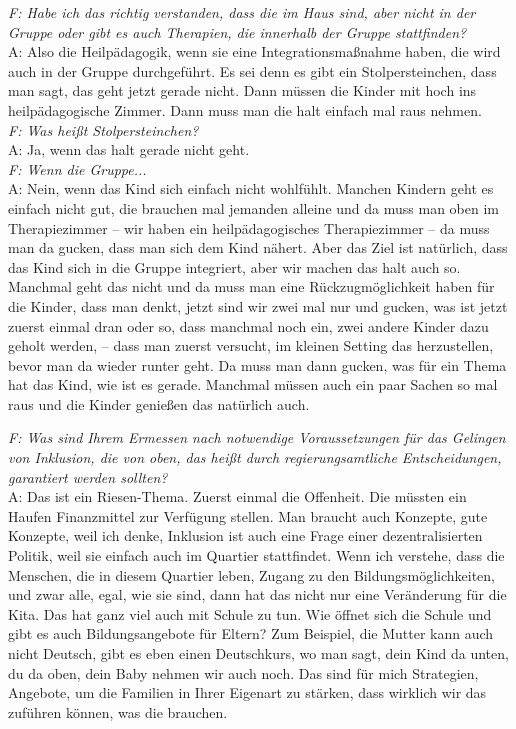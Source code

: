 \begin{linenumbers*}
\emph{F: Habe ich das richtig verstanden, dass die im Haus sind, aber nicht in der Gruppe oder gibt es auch Therapien, die innerhalb der Gruppe stattfinden?}\\ 
A: Also die Heilpädagogik, wenn sie eine Integrationsmaßnahme haben, die wird auch in der Gruppe durchgeführt. Es sei denn es gibt ein Stolpersteinchen, dass man sagt, das geht jetzt gerade nicht. Dann müssen die Kinder mit hoch ins heilpädagogische Zimmer. Dann muss man die halt einfach mal raus nehmen.\\
\emph{F: Was heißt Stolpersteinchen?}\\ 
A: Ja, wenn das halt gerade nicht geht.\\ 
\emph{F: Wenn die Gruppe...}\\
A: Nein, wenn das Kind sich einfach nicht wohlfühlt. Manchen Kindern geht es einfach nicht gut, die brauchen mal jemanden alleine und da muss man oben im Therapiezimmer -- wir haben ein heilpädagogisches Therapiezimmer -- da muss man da gucken, dass man sich dem Kind nähert. Aber das Ziel ist natürlich, dass das Kind sich in die Gruppe integriert, aber wir machen das halt auch so. Manchmal geht das nicht und da muss man eine Rückzugmöglichkeit haben für die Kinder, dass man denkt, jetzt sind wir zwei mal nur und gucken, was ist jetzt zuerst einmal dran oder so, dass manchmal noch ein, zwei andere Kinder dazu geholt werden, -- dass man zuerst versucht, im kleinen Setting das herzustellen, bevor man da wieder runter geht. Da muss man dann gucken, was für ein Thema hat das Kind, wie ist es gerade. Manchmal müssen auch ein paar Sachen so mal raus und die Kinder genießen das natürlich auch. 

\emph{F: Was sind Ihrem Ermessen nach notwendige Voraussetzungen für das Gelingen von Inklusion, die von oben, das heißt durch regierungsamtliche Entscheidungen, garantiert werden sollten?}\\
A: Das ist ein Riesen-Thema. Zuerst einmal die Offenheit. Die müssten ein Haufen Finanzmittel zur Verfügung stellen. Man braucht auch Konzepte, gute Konzepte, weil ich denke, Inklusion ist auch eine Frage einer dezentralisierten Politik, weil sie einfach auch im Quartier stattfindet. Wenn ich verstehe, dass die Menschen, die in diesem Quartier leben, Zugang zu den Bildungsmöglichkeiten, und zwar alle, egal, wie sie sind, dann hat das nicht nur eine Veränderung für die Kita. Das hat ganz viel auch mit Schule zu tun. Wie öffnet sich die Schule und gibt es auch Bildungsangebote für Eltern? Zum Beispiel, die Mutter kann auch nicht Deutsch, gibt es eben einen Deutschkurs, wo man sagt, dein Kind da unten, du da oben, dein Baby nehmen wir auch noch. Das sind für mich Strategien, Angebote, um die Familien in Ihrer Eigenart zu stärken, dass wirklich wir das zuführen können, was die brauchen.


\end{linenumbers*}
